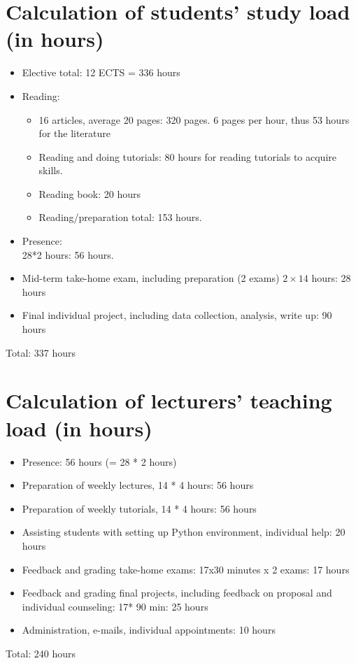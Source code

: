 \documentclass[a4paper,12pt]{report}
\begin{document}
\chapter{Calculation of students' study load (in hours)}
\begin{itemize}

\item Elective total: 12 ECTS = 336 hours
\item Reading: 
\begin{itemize}
\item 16 articles, average 20 pages: 320 pages. 6 pages per hour, thus 53 hours for the literature
\item Reading and doing tutorials: 80 hours for reading tutorials to acquire skills.
\item Reading book: 20 hours
\item Reading/preparation total: 153 hours.
\end{itemize}
\item Presence: \\28*2 hours: 56 hours.
\item Mid-term take-home exam, including preparation (2 exams) $2 \times 14$ hours: 28 hours
\item Final individual project, including data collection, analysis, write up: 90 hours
\end{itemize}

Total: 337 hours



\chapter{Calculation of lecturers' teaching load (in hours)}
\begin{itemize}
\item Presence: 56 hours (= 28 * 2 hours)
\item Preparation of weekly lectures, 14 * 4 hours: 56 hours
\item Preparation of weekly tutorials, 14 * 4 hours: 56 hours
\item Assisting students with setting up Python environment, individual help: 20 hours
\item Feedback and grading take-home exams: 17x30 minutes x 2 exams: 17 hours
\item Feedback and grading final projects, including feedback on proposal and individual counseling: 17* 90 min: 25 hours 
\item Administration, e-mails, individual appointments: 10 hours
\end{itemize}
Total: 240 hours
\end{document}
